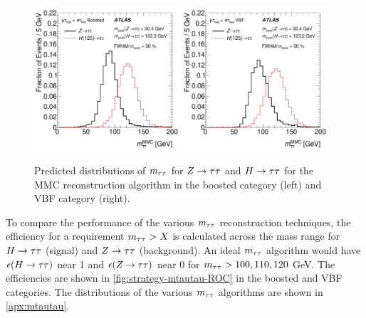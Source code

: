 \begin{figure}[tp]
  \centering
  \includegraphics[width=0.48\textwidth]{figures/HIGG-2013-32/fig_01b}
  \includegraphics[width=0.48\textwidth]{figures/HIGG-2013-32/fig_01a}
  \caption{Predicted distributions of $m_{\tau\tau}$ for $Z\rightarrow\tau\tau$ and $H\rightarrow\tau\tau$ for the MMC reconstruction algorithm in the boosted category (left) and VBF category (right).}
  \label{fig:strategy-mtautau-raw}
\end{figure}

To compare the performance of the various $m_{\tau\tau}$ reconstruction techniques, the efficiency for a requirement $m_{\tau\tau} > X$ is calculated across the mass range for $H\rightarrow\tau\tau$ (signal) and $Z\rightarrow\tau\tau$ (background). An ideal $m_{\tau\tau}$ algorithm would have $\epsilon(H\rightarrow\tau\tau)$ near 1 and $\epsilon(Z\rightarrow\tau\tau)$ near 0 for $m_{\tau\tau} > 100, 110, 120$ GeV. The efficiencies are shown in \cref{fig:strategy-mtautau-ROC} in the boosted and VBF categories. The distributions of the various $m_{\tau\tau}$ algorithms are shown in \cref{apx:mtautau}.

